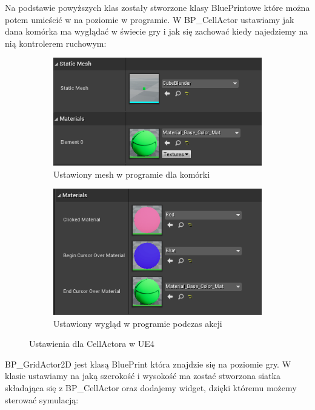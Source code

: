 \documentclass[a4paper,12pt,reqno]{article}
\begin{document}
{\color{red}
Na podstawie powyższych klas zostały stworzone klasy BluePrintowe które można potem umieścić w na poziomie w programie. W BP\_CellActor ustawiamy jak dana komórka ma wyglądać w świecie gry i jak się zachować kiedy najedziemy na nią kontrolerem ruchowym:

\begin{figure}[H]%
	\centering
	\begin{subfigure}{.45\textwidth}
		\centering
		\includegraphics[width=0.8\linewidth]{graphics/gameoflife/CellActorInUE_1.png}
		\caption{Ustawiony mesh w programie dla komórki}	
		\label{ref:subref_a}
	\end{subfigure}%
	\begin{subfigure}{.45\textwidth}
		\centering
		\includegraphics[width=0.8\linewidth]{graphics/gameoflife/CellActorInUE_2.png}
		\caption{Ustawiony wygląd w programie podczas akcji}
		\label{ref:subref_b}
	\end{subfigure}%
	

\caption{Ustawienia dla CellActora w UE4}
\label{ref:ref}
\end{figure}

BP\_GridActor2D jest klasą BluePrint która znajdzie się na poziomie gry. W klasie ustawiamy na jaką szerokość i wysokość ma zostać stworzona siatka składająca się z BP\_CellActor oraz dodajemy widget, dzięki któremu możemy sterować symulacją:

}
\end{document}
